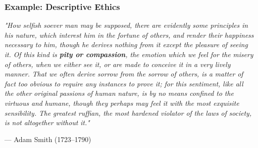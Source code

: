 \documentclass[aspectratio=169, 10pt]{beamer}
\begin{document}
\begin{frame}
\frametitle{Example: Descriptive Ethics}

\begin{tcolorbox}[colback=WHUblue!5!white, colframe=WHUblue, title=Adam Smith, fonttitle=\bfseries, sharp corners=south]
\textit{
"How selfish soever man may be supposed, there are evidently some principles in his nature, which interest him in the fortune of others, and render their happiness necessary to him, though he derives nothing from it except the pleasure of seeing it. Of this kind is \textbf{pity or compassion}, the emotion which we feel for the misery of others, when we either see it, or are made to conceive it in a very lively manner. That we often derive \textcolor{WHUblue}{sorrow from the sorrow of others}, is a matter of fact too obvious to require any instances to prove it; for this sentiment, like all the other original passions of human nature, is by no means confined to the virtuous and humane, though they perhaps may feel it with the most exquisite sensibility. \textcolor{WHUblue}{The greatest ruffian, the most hardened violator of the laws of society, is not altogether without it.}"
}
\end{tcolorbox}

\vspace{0.5em}
\hfill\scriptsize--- Adam Smith (1723--1790)
\end{frame}

  
\end{document}
